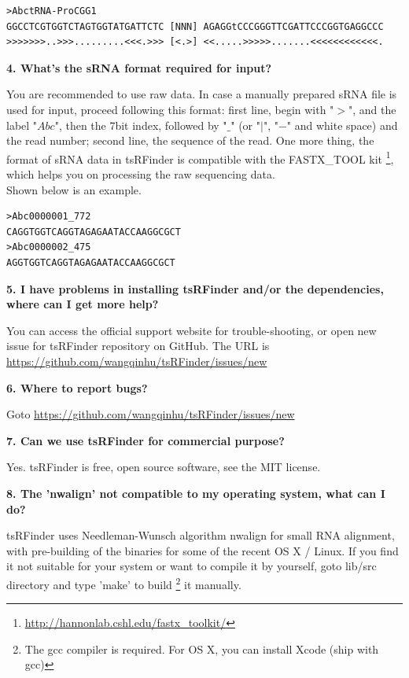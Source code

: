 \documentclass[11pt, a4paper]{article}
\begin{document}
{\scriptsize \begin{tcolorbox}[colback=blue!5!white,colframe=pink!75!black,title=tRNA example]
\begin{verbatim}
>AbctRNA-ProCGG1
GGCCTCGTGGTCTAGTGGTATGATTCTC [NNN] AGAGGtCCCGGGTTCGATTCCCGGTGAGGCCC
>>>>>>>..>>>.........<<<.>>> [<.>] <<.....>>>>>.......<<<<<<<<<<<<.
\end{verbatim}
\end{tcolorbox}}

\textbf{4. What's the sRNA format required for input?}

You are recommended to use raw data. In case a manually prepared sRNA file is used for input, proceed following this format: first line, begin with "$>$", and the label "$Abc$", then the 7\-bit index, followed by "$\_$" (or "$|$", "$-$" and white space) and the read number; second line, the sequence of the read. One more thing, the format of sRNA data in tsRFinder is compatible with the FASTX\_TOOL kit \footnote{\url{http://hannonlab.cshl.edu/fastx_toolkit/}}, which helps you on processing the raw sequencing data.\\
Shown below is an example.

{\scriptsize \begin{tcolorbox}[colback=blue!5!white,colframe=pink!75!black,title=sRNA example]
\begin{verbatim}
>Abc0000001_772
CAGGTGGTCAGGTAGAGAATACCAAGGCGCT
>Abc0000002_475
AGGTGGTCAGGTAGAGAATACCAAGGCGCT
\end{verbatim}
\end{tcolorbox}}


\textbf{5. I have problems in installing tsRFinder and/or the dependencies, where can I get more help?}

You can access the official support website for trouble-shooting, or open new issue for tsRFinder repository on GitHub. The URL is \url{https://github.com/wangqinhu/tsRFinder/issues/new}

\textbf{6. Where to report bugs?}

Goto \url{https://github.com/wangqinhu/tsRFinder/issues/new}

\textbf{7. Can we use tsRFinder for commercial purpose?}

Yes. tsRFinder is free, open source software, see the MIT license.

\textbf{8. The 'nwalign' not compatible to my operating system, what can I do?}
 
tsRFinder uses Needleman-Wunsch algorithm nwalign for small RNA alignment, with pre-building of the binaries for some of the recent OS X / Linux. If you find it not suitable for your system or want to compile it by yourself, goto lib/src directory and type 'make' to build \footnote{The gcc compiler is required. For OS X, you can install Xcode (ship with gcc)} it manually.
\end{document}
